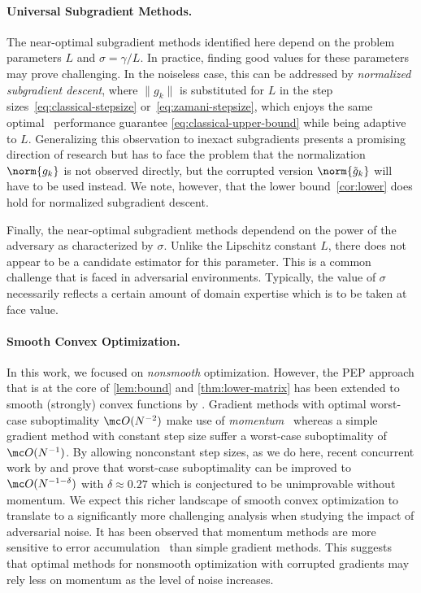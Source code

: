 \documentclass{article}
\begin{document}
\paragraph{Universal Subgradient Methods.}

The near-optimal subgradient methods identified here depend on the problem parameters $L$ and $\sigma=\gamma/L$.
In practice, finding good values for these parameters may prove challenging.
In the noiseless case, this can be addressed by \emph{normalized subgradient descent}, where $\|g_k\|$ is substituted for $L$ in the step sizes~\eqref{eq:classical-stepsize} or~\eqref{eq:zamani-stepsize}, which enjoys the same optimal~\citep{boyd2003subgradient,zamani2023exact} performance guarantee \eqref{eq:classical-upper-bound} while being adaptive to $L$. 
Generalizing this observation to inexact subgradients presents a promising direction of research but has to face the problem that the normalization $\norm{g_k}$ is not observed directly, but the corrupted version $\norm{\tilde g_k}$ will have to be used instead. We note, however, that the lower bound~\cref{cor:lower} does hold for normalized subgradient descent.

Finally, the near-optimal subgradient methods dependend on the power of the adversary as characterized by $\sigma$. Unlike the Lipschitz constant $L$, there does not appear to be a candidate estimator for this parameter. This is a common challenge that is faced in adversarial environments.  Typically, the value of $\sigma$ necessarily reflects a certain amount of domain expertise which is to be taken at face value. 


\paragraph{Smooth Convex Optimization.}
In this work, we focused on \emph{nonsmooth} optimization. However, the PEP approach that is at the core of \cref{lem:bound} and \cref{thm:lower-matrix} has been extended to smooth (strongly) convex functions by \cite{taylor_smooth_2017, deklerk2017worst}.
Gradient methods with optimal worst-case suboptimality $\mc O(N^{-2})$ make use of \emph{momentum}~\citep{kim_optimized_2016, nesterov1983method} whereas a simple gradient method with constant step size suffer a worst-case suboptimality of $\mc O (N^{-1})$.
By allowing nonconstant step sizes, as we do here, recent concurrent work by \citet{grimmer2024provably} and \citet{altschuler2025acceleration} prove that worst-case suboptimality can be improved to $\mc O(N^{-1-\delta})$ with $\delta\approx 0.27$ which is conjectured to be unimprovable without momentum.
We expect this richer landscape of smooth convex optimization to translate to a significantly more challenging analysis when studying the impact of adversarial noise.
It has been observed that momentum methods are more sensitive to error accumulation~\citep{devolder2014first,liu2024nonasymptotic} than simple gradient methods. This suggests that optimal methods for nonsmooth optimization with corrupted gradients may rely less on momentum as the level of noise increases.



%

\end{document}
